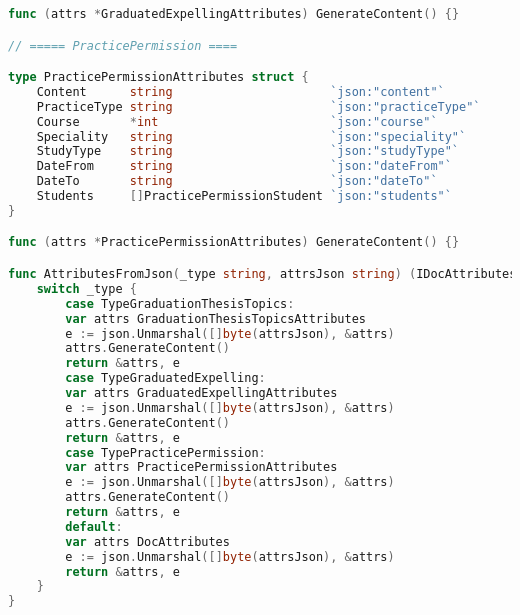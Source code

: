 \begin{lstlisting}[language=Go]
func (attrs *GraduatedExpellingAttributes) GenerateContent() {}

// ===== PracticePermission ====

type PracticePermissionAttributes struct {
	Content      string                      `json:"content"`
	PracticeType string                      `json:"practiceType"`
	Course       *int                        `json:"course"`
	Speciality   string                      `json:"speciality"`
	StudyType    string                      `json:"studyType"`
	DateFrom     string                      `json:"dateFrom"`
	DateTo       string                      `json:"dateTo"`
	Students     []PracticePermissionStudent `json:"students"`
}

func (attrs *PracticePermissionAttributes) GenerateContent() {}

func AttributesFromJson(_type string, attrsJson string) (IDocAttributes, error) {
	switch _type {
		case TypeGraduationThesisTopics:
		var attrs GraduationThesisTopicsAttributes
		e := json.Unmarshal([]byte(attrsJson), &attrs)
		attrs.GenerateContent()
		return &attrs, e
		case TypeGraduatedExpelling:
		var attrs GraduatedExpellingAttributes
		e := json.Unmarshal([]byte(attrsJson), &attrs)
		attrs.GenerateContent()
		return &attrs, e
		case TypePracticePermission:
		var attrs PracticePermissionAttributes
		e := json.Unmarshal([]byte(attrsJson), &attrs)
		attrs.GenerateContent()
		return &attrs, e
		default:
		var attrs DocAttributes
		e := json.Unmarshal([]byte(attrsJson), &attrs)
		return &attrs, e
	}
}	
\end{lstlisting}

